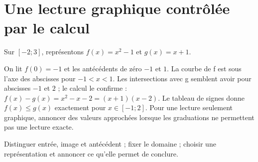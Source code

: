 \documentclass[../cours_2de.tex]{subfiles}
\begin{document}
\section{Une lecture graphique contrôlée par le calcul}
Sur $[-2;3]$, représentons $f(x)=x^2-1$ et $g(x)=x+1$.
\begin{center}
\end{center}
On lit $f(0)=-1$ et les antécédents de zéro $-1$ et $1$.
La courbe de f est sous l'axe des abscisses pour $-1<x<1$.
Les intersections avec g semblent avoir pour abscisses $-1$ et $2$ ; le calcul le confirme :
$f(x)-g(x)=x^2-x-2=(x+1)(x-2)$.
Le tableau de signes donne $f(x)\le g(x)$ exactement pour $x\in[-1;2]$.
Pour une lecture seulement graphique, annoncer des valeurs approchées lorsque les graduations ne permettent pas une lecture exacte.
\begin{retenir}
Distinguer entrée, image et antécédent ; fixer le domaine ; choisir une représentation et annoncer ce qu'elle permet de conclure.
\end{retenir}
\end{document}
